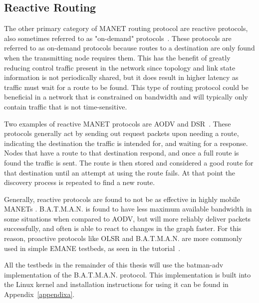 \subsection{Reactive Routing}
The other primary category of MANET routing protocol are reactive protocols, also sometimes referred to as "on-demand" protocols~\cite{manet_survey}.
These protocols are referred to as on-demand protocols because routes to a destination are only found when the transmitting node requires them.
This has the benefit of greatly reducing control traffic present in the network since topology and link state information is not periodically shared, but it does result in higher latency as traffic must wait for a route to be found.
This type of routing protocol could be beneficial in a network that is constrained on bandwidth and will typically only contain traffic that is not time-sensitive.\par
Two examples of reactive MANET protocols are AODV and DSR~\cite{reactive_routing}.
These protocols generally act by sending out request packets upon needing a route, indicating the destination the traffic is intended for, and waiting for a response.
Nodes that have a route to that destination respond, and once a full route is found the traffic is sent.
The route is then stored and considered a good route for that destination until an attempt at using the route fails.
At that point the discovery process is repeated to find a new route.\par
Generally, reactive protocols are found to not be as effective in highly mobile MANETs \cite{aodv_batman,reactive_routing}.
B.A.T.M.A.N. is found to have less maximum available bandwidth in some situations when compared to AODV, but will more reliably deliver packets successfully, and often is able to react to changes in the graph faster.
For this reason, proactive protocols like OLSR and B.A.T.M.A.N. are more commonly used in simple EMANE testbeds, as seen in the tutorial~\cite{emane_tutorial}.\par
All the testbeds in the remainder of this thesis will use the batman-adv implementation of the B.A.T.M.A.N. protocol.
This implementation is built into the Linux kernel and installation instructions for using it can be found in Appendix~\ref{appendixa}.

